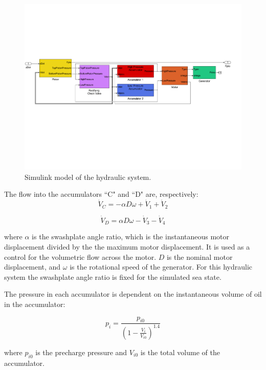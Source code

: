 \documentclass[twocolumn,10pt]{asme2e}
\begin{document}
\begin{figure}[t]	
    \centering
    \includegraphics[width=2\columnwidth]{Images/ptomodel_color}  
    \caption{Simulink model of the hydraulic system.}
    \label{Hyd}
    \end{figure}

The flow into the accumulators ``C" and ``D" are, respectively: 
\begin{equation}
\dot{V}_C=-\alpha D \omega+\dot{V}_1+\dot{V}_2 
\end{equation}

\begin{equation}
\dot{V}_D=\alpha D \omega-\dot{V}_3-\dot{V}_4 
\end{equation}

where $\alpha$ is the swashplate angle ratio, which is the instantaneous motor displacement divided by the the maximum motor displacement. It is used as a control for the volumetric flow across the motor. $D$ is the nominal motor displacement, and $\omega$ is the rotational speed of the generator. 
For this hydraulic system the swashplate angle ratio is fixed for the simulated sea state. 

The pressure in each accumulator is dependent on the instantaneous volume of oil in the accumulator:

\begin{equation}
p_i=\frac{p_{i0}}{(1-\frac{V_i}{V_{i0}})^{1.4}}
\end{equation}

where $p_{i0}$ is the precharge pressure and $V_{i0}$ is the total volume of the accumulator. 
\end{document}
